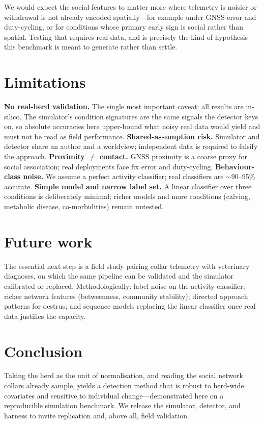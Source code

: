 \documentclass[11pt]{article}
\begin{document}
We would expect the social features to matter more where telemetry is noisier or
withdrawal is not already encoded spatially---for example under GNSS error and
duty-cycling, or for conditions whose primary early sign is social rather than
spatial. Testing that requires real data, and is precisely the kind of
hypothesis this benchmark is meant to generate rather than settle.

\section{Limitations}
\label{sec:limitations}
\textbf{No real-herd validation.} The single most important caveat: all results
are in-silico. The simulator's condition signatures are the same signals the
detector keys on, so absolute accuracies here upper-bound what noisy real data
would yield and must not be read as field performance. \textbf{Shared-assumption
risk.} Simulator and detector share an author and a worldview; independent data
is required to falsify the approach. \textbf{Proximity $\neq$ contact.} GNSS
proximity is a coarse proxy for social association; real deployments face fix
error and duty-cycling. \textbf{Behaviour-class noise.} We assume a perfect
activity classifier; real classifiers are $\sim$90--95\% accurate.
\textbf{Simple model and narrow label set.} A linear classifier over three
conditions is deliberately minimal; richer models and more conditions (calving,
metabolic disease, co-morbidities) remain untested.

\section{Future work}
The essential next step is a field study pairing collar telemetry with
veterinary diagnoses, on which the same pipeline can be validated and the
simulator calibrated or replaced. Methodologically: label noise on the activity
classifier; richer network features (betweenness, community stability); directed
approach patterns for oestrus; and sequence models replacing the linear
classifier once real data justifies the capacity.

\section{Conclusion}
Taking the herd as the unit of normalisation, and reading the social network
collars already sample, yields a detection method that is robust to herd-wide
covariates and sensitive to individual change---demonstrated here on a
reproducible simulation benchmark. We release the simulator, detector, and
harness to invite replication and, above all, field validation.

{\small


}
\end{document}
